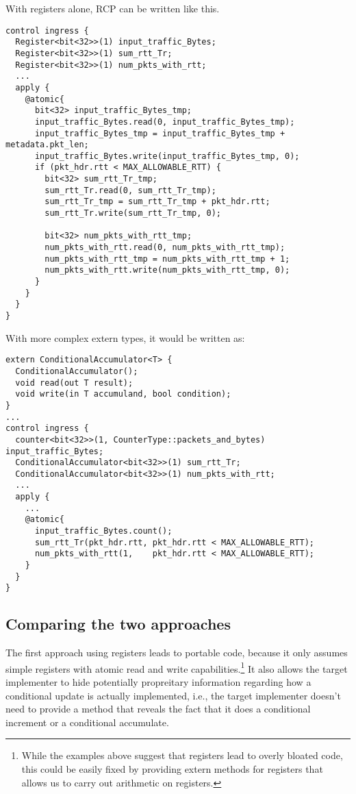 With registers alone, RCP can be written like this.
\begin{verbatim}
control ingress {
  Register<bit<32>>(1) input_traffic_Bytes;
  Register<bit<32>>(1) sum_rtt_Tr;
  Register<bit<32>>(1) num_pkts_with_rtt;
  ...
  apply {
    @atomic{
      bit<32> input_traffic_Bytes_tmp;
      input_traffic_Bytes.read(0, input_traffic_Bytes_tmp);
      input_traffic_Bytes_tmp = input_traffic_Bytes_tmp + metadata.pkt_len;
      input_traffic_Bytes.write(input_traffic_Bytes_tmp, 0);
      if (pkt_hdr.rtt < MAX_ALLOWABLE_RTT) {
        bit<32> sum_rtt_Tr_tmp;
        sum_rtt_Tr.read(0, sum_rtt_Tr_tmp);
        sum_rtt_Tr_tmp = sum_rtt_Tr_tmp + pkt_hdr.rtt;
        sum_rtt_Tr.write(sum_rtt_Tr_tmp, 0);

        bit<32> num_pkts_with_rtt_tmp;
        num_pkts_with_rtt.read(0, num_pkts_with_rtt_tmp);
        num_pkts_with_rtt_tmp = num_pkts_with_rtt_tmp + 1;
        num_pkts_with_rtt.write(num_pkts_with_rtt_tmp, 0);
      }
    }
  }
}
\end{verbatim}

With more complex extern types, it would be written as:
\begin{verbatim}
extern ConditionalAccumulator<T> {
  ConditionalAccumulator();
  void read(out T result);
  void write(in T accumuland, bool condition);
}
...
control ingress {
  counter<bit<32>>(1, CounterType::packets_and_bytes) input_traffic_Bytes;
  ConditionalAccumulator<bit<32>>(1) sum_rtt_Tr;
  ConditionalAccumulator<bit<32>>(1) num_pkts_with_rtt;
  ...
  apply {
    ... 
    @atomic{
      input_traffic_Bytes.count();
      sum_rtt_Tr(pkt_hdr.rtt, pkt_hdr.rtt < MAX_ALLOWABLE_RTT);
      num_pkts_with_rtt(1,    pkt_hdr.rtt < MAX_ALLOWABLE_RTT);
    }
  }
}
\end{verbatim}

\subsection{Comparing the two approaches}
The first approach using registers leads to portable code, because it only
assumes simple registers with atomic read and write
capabilities.\footnote{While the examples above suggest that registers lead to
overly bloated code, this could be easily fixed by providing extern methods for
registers that allows us to carry out arithmetic on registers.} It also allows
the target implementer to hide potentially propreitary information regarding
how a conditional update is actually implemented, i.e., the target implementer
doesn't need to provide a method that reveals the fact that it does a
conditional increment or a conditional accumulate.

